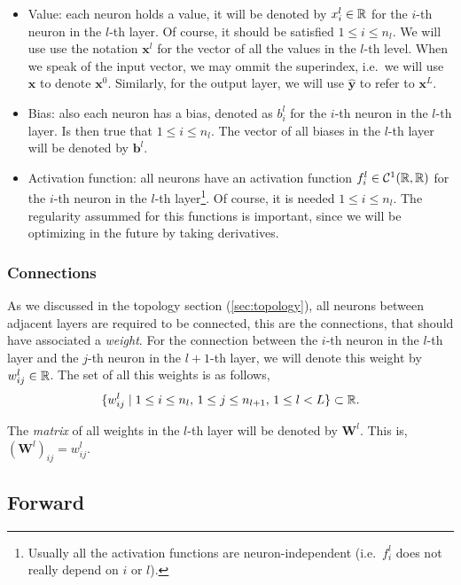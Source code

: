 \begin{itemize}
  \item Value: each neuron holds a value, it will be denoted by \(x_i^l \in \mathbb{R}\)
  for the \(i\)-th neuron in the \(l\)-th layer. Of course, it should be satisfied
  \(1 \leq i \leq n_l\). We will use use the notation \(\mathbf{x}^l\) for the
  vector of all the values in the \(l\)-th level. When we speak of the input
  vector, we may ommit the superindex, i.e.\ we will use \(\mathbf{x}\) to denote
  \(\mathbf{x}^0\). Similarly, for the output layer, we will use
  \(\mathbf{\hat{y}}\) to refer to \(\mathbf{x}^L\).
  \item Bias: also each neuron has a bias, denoted as \(b_i^l\) for the
  \(i\)-th neuron in the \(l\)-th layer. Is then true that
  \(1 \leq i \leq n_l\). The vector of all biases in the \(l\)-th layer will be
  denoted by \(\mathbf{b}^l\).
  \item Activation function: all neurons have an activation function
  \(f_i^l \in \mathcal{C}^1(\mathbb{R}, \mathbb{R})\) for the \(i\)-th neuron in the \(l\)-th
  layer\footnote{Usually all the activation functions are neuron-independent
    (i.e.\ \(f_i^l\) does not really depend on \(i\) or \(l\)).}. Of course, it is
  needed \(1 \leq i \leq n_l\). The regularity assummed for this functions is
  important, since we will be optimizing in the future by taking derivatives.
\end{itemize}

\subsubsection{Connections}
As we discussed in the topology section (\ref{sec:topology}), all neurons
between adjacent layers are required to be connected, this are the connections,
that should have associated a \emph{weight}. For the connection between the
\(i\)-th neuron in the \(l\)-th layer and the \(j\)-th neuron in the
\(l + 1\)-th layer, we will denote this weight by \(w_{ij}^l \in \mathbb{R}\). The set of
all this weights is as follows,
\begin{equation}
   \{w_{ij}^l \mid 1 \leq i \leq n_{l}, \, 1 \leq j \leq n_{l+1}, \, 1 \leq l <
   L \} \subset \mathbb{R}.
 \end{equation}

The \emph{matrix} of all weights in the \(l\)-th layer will be denoted by
\(\mathbf{W}^l\). This is, \((\mathbf{W}^l)_{ij} = w_{ij}^l\).

\subsection{Forward}
\label{subsec:forward}


